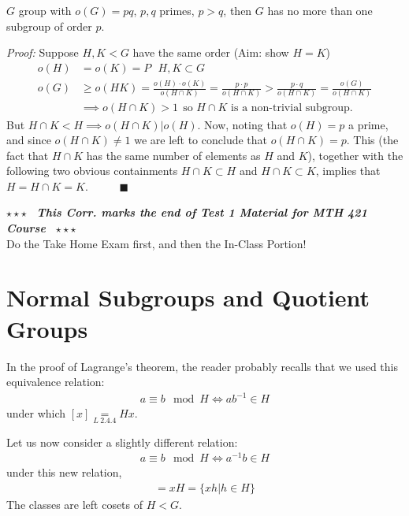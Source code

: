 \newpage
\begin{corollary}
$G$ group with $o(G)=pq$, $p,q$ primes, $p>q$, then $G$ has no more than one subgroup of order $p$.
\steezybreak

\noindent \textit{Proof:} Suppose $H,K<G$ have the same order (Aim: show $H=K$)
\begin{align}
    o(H)&=o(K)=P \ \ \ H,K \subset G \nonumber \\
    o(G)&\geq o(HK) = \frac{o(H)\cdot o(K)}{o(H\cap K)}= \frac{p\cdot p}{o(H\cap K)} > \frac{p\cdot q}{o(H\cap K)} = \frac{o(G)}{o(H\cap K)} \nonumber \\
    &\implies o(H\cap K)>1 \ \ \text{so }H\cap K\text{ is a non-trivial subgroup.} \nonumber
\end{align}
But $H\cap K < H \implies o(H\cap K)|o(H)$. Now, noting that $o(H)=p$ a prime, and since
$o(H\cap K)\neq 1$ we are left to conclude that $o(H\cap K)=p$. This (the fact that $H\cap K$ has
the same number of elements as $H$ and $K$), together with the following two obvious containments
$H\cap K \subset H$ and $H\cap K \subset K$, implies that $H=H\cap K = K$.
\ \ \ \ \ $\blacksquare$
\end{corollary}

\steezybreak
\begin{tcolorbox}
\begin{center}
    $\star\star\star$ \textbf{\textit{~This Corr. marks the end of Test 1 Material for MTH 421
    Course~}} $\star\star\star$ \\
    Do the Take Home Exam first, and then the In-Class Portion!
\end{center}
\end{tcolorbox}
\steezybreak
\section{Normal Subgroups and Quotient Groups}
In the proof of Lagrange's theorem, the reader probably recalls that we used this equivalence
relation:
\begin{align}
    a\equiv b \mod H \iff ab^{-1}\in H \nonumber
\end{align}
under which $[x]\underset{L \ 2.4.4}{=}Hx$. \steezybreak

\noindent Let us now consider a slightly different relation:
\begin{align}
    a\equiv b \mod H \iff a^{-1}b\in H \nonumber
\end{align}
under this new relation,
\begin{align}
    [x]=xH= \{xh|h\in H\} \nonumber
\end{align}
The classes are left cosets of $H<G$.\steezybreak

